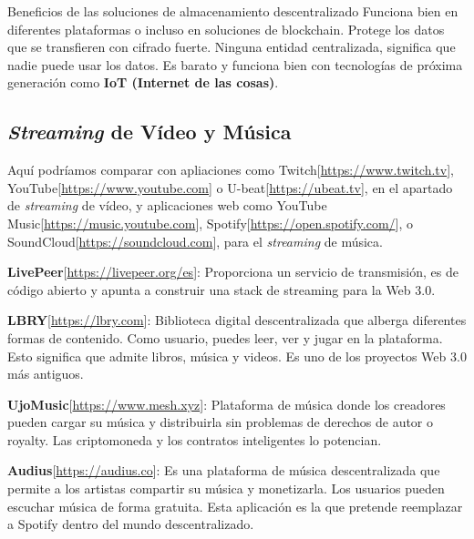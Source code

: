 Beneficios de las soluciones de almacenamiento descentralizado Funciona bien en
diferentes plataformas o incluso en soluciones de blockchain. Protege los datos
que se transfieren con cifrado fuerte. Ninguna entidad centralizada, significa
que nadie puede usar los datos. Es barato y funciona bien con tecnologías de
próxima generación como \textbf{IoT (Internet de las cosas)}.

\hfill \break
\subsection*{\textit{Streaming} de Vídeo y Música} \label{webs-streaming} Aquí podríamos comparar con
apliaciones como Twitch[\url{https://www.twitch.tv}],
YouTube[\url{https://www.youtube.com}] o U-beat[\url{https://ubeat.tv}], en el
apartado de \textit{streaming} de vídeo, y aplicaciones web como YouTube
Music[\url{https://music.youtube.com}],
Spotify[\url{https://open.spotify.com/}], o
SoundCloud[\url{https://soundcloud.com}], para el \textit{streaming} de música.

\hfill \break
\textbf{LivePeer}[\url{https://livepeer.org/es}]: Proporciona un servicio de
transmisión, es de código abierto y apunta a construir una stack de streaming
para la Web 3.0.

\hfill \break
\textbf{LBRY}[\url{https://lbry.com}]: Biblioteca digital
descentralizada que alberga diferentes formas de contenido. Como usuario,
puedes leer, ver y jugar en la plataforma. Esto significa que admite libros,
música y videos. Es uno de los proyectos Web 3.0 más antiguos.

\hfill \break
\textbf{UjoMusic}[\url{https://www.mesh.xyz}]: Plataforma de música donde los
creadores pueden cargar su música y distribuirla sin problemas de derechos de
autor o royalty. Las criptomoneda y los contratos inteligentes lo potencian.

\hfill \break
\textbf{Audius}[\url{https://audius.co}]: Es una plataforma de música
descentralizada que permite a los artistas compartir su música y monetizarla.
Los usuarios pueden escuchar música de forma gratuita. Esta aplicación es la
que pretende reemplazar a Spotify dentro del mundo descentralizado.

